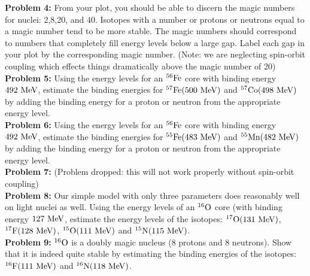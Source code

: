 \documentclass[12pt]{article}
\begin{document}
\noindent
{\bf Problem 4:} From your plot, you should be able to discern the
magic numbers for nuclei: 2,8,20, and 40.  Isotopes with a number or
protons or neutrons equal to a magic number tend to be more stable.
The magic numbers should correspond to numbers that completely fill energy levels below a large gap.  Label each gap in your plot by the corresponding magic number. (Note:  we are neglecting spin-orbit coupling which effects things dramatically above the magic number of 20)\\[5pt]

\noindent
{\bf Problem 5:} Using the energy levels for an $^{56}\rm Fe$ core
with binding energy $492~\rm MeV$, estimate the binding energies for
$^{57}\rm Fe (500~MeV)$ and $^{57}\rm Co (498~MeV)$ by adding the
binding energy for a proton or neutron from the appropriate energy level.\\[5pt]

\noindent
{\bf Problem 6:} Using the energy levels for an $^{56}\rm Fe$ core
with binding energy $492~\rm MeV$, estimate the binding energies for
$^{55}\rm Fe (483~MeV)$ and $^{55}\rm Mn (482~MeV)$ by adding the
binding energy for a proton or neutron from the appropriate energy level.\\[5pt]

\noindent
{\bf Problem 7:}  (Problem dropped:  this will not work properly without spin-orbit coupling) \\[5pt]

\noindent
{\bf Problem 8:}  Our simple model with only three parameters does reasonably well on light nuclei as well.  Using the energy levels of an $^{16}\rm O$ core (with binding energy $127~\rm MeV$, estimate the energy levels of the isotopes: $^{17}\rm O (131~MeV)$, $^{17}\rm F (128~MeV)$,
$^{15}\rm O (111~MeV)$ and $^{15}\rm N (115~MeV)$.\\[5pt]

\noindent
{\bf Problem 9:} $^{16}\rm O$ is a doubly magic nucleus (8 protons and 8 neutrons).  Show that it is indeed quite stable by estimating the binding energies of the isotopes:
$^{16}\rm F (111~MeV)$ and $^{16}\rm N (118~MeV)$.\\[5pt]














    
\end{document}
